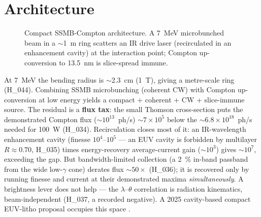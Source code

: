 \documentclass[11pt,a4paper]{article}
\newcommand{\hyp}[1]{\textcolor{blue!45!black}{\textsf{\small #1}}}
\begin{document}
\section{Architecture}
\label{sec:arch}
\begin{figure}[t]
\centering
{}
\caption{Compact SSMB-Compton architecture. A \SI{7}{\mega\electronvolt} microbunched beam in a
$\sim$\SI{1}{\meter} ring scatters an IR drive laser (recirculated in an enhancement cavity) at the
interaction point; Compton up-conversion to \SI{13.5}{\nano\meter} is slice-spread immune.}
\label{fig:arch}
\end{figure}

At \SI{7}{\mega\electronvolt} the bending radius is $\sim$\SI{2.3}{\centi\meter} (\SI{1}{\tesla}),
giving a metre-scale ring (\hyp{H\_044}). Combining SSMB microbunching (coherent CW) with Compton
up-conversion at low energy yields a compact + coherent + CW + slice-immune source. The residual is a
\textbf{flux tax}: the small Thomson cross-section puts the demonstrated Compton flux
($\sim\!10^{13}$~ph/s) $\sim\!7\times10^{5}$ below the $\sim\!6.8\times10^{18}$~ph/s needed for
\SI{100}{\watt} (\hyp{H\_034}). Recirculation closes most of it: an IR-wavelength enhancement cavity
(finesse $10^{4}$--$10^{5}$ --- an EUV cavity is forbidden by multilayer $R\!\approx\!0.70$,
\hyp{H\_035}) times energy-recovery average-current gain ($\sim\!10^{3}$) gives $\sim\!10^{7}$,
exceeding the gap. But bandwidth-limited collection (a \SI{2}{\percent} in-band passband from the
wide low-$\gamma$ cone) derates flux $\sim\!50\times$ (\hyp{H\_036}); it is recovered only by running
finesse and current at their demonstrated maxima \emph{simultaneously}. A brightness lever does not
help --- the $\lambda$--$\theta$ correlation is radiation kinematics, beam-independent (\hyp{H\_037},
a recorded negative). A 2025 cavity-based compact EUV-litho proposal occupies this space
\citep{he2025}.
\end{document}
